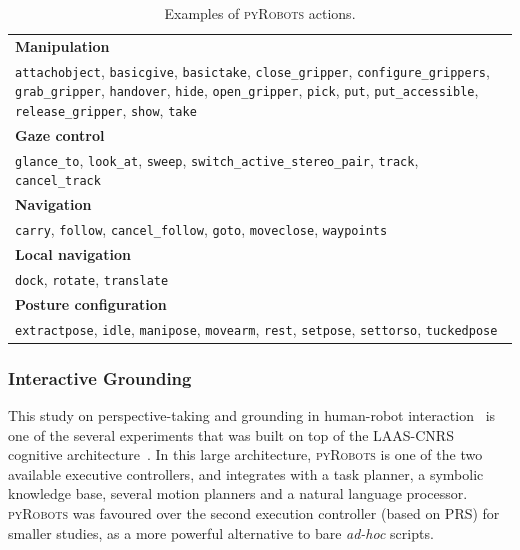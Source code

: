 \documentclass[letterpaper, 10pt, conference]{ieeeconf}      %
\newcommand{\pyRobots}{\textsc{pyRobots}}
\begin{document}
\begin{table}[ht!]
\begin{center}
\begin{tabular}{p{}}
    \toprule
    {\bf Manipulation} \\
     {\tt attachobject}, {\tt basicgive}, {\tt basictake}, {\tt close\_gripper}, {\tt configure\_grippers}, {\tt grab\_gripper}, {\tt handover}, {\tt hide}, {\tt open\_gripper}, {\tt pick}, {\tt put}, {\tt put\_accessible}, {\tt release\_gripper}, {\tt show}, {\tt take} \\
     \midrule
    {\bf Gaze control} \\
     {\tt glance\_to}, {\tt look\_at}, {\tt sweep}, {\tt switch\_active\_stereo\_pair}, {\tt track}, {\tt cancel\_track} \\
     \midrule
    {\bf Navigation} \\
     {\tt carry}, {\tt follow}, {\tt cancel\_follow}, {\tt goto}, {\tt moveclose}, {\tt waypoints} \\
     \midrule
    {\bf Local navigation} \\
     {\tt dock}, {\tt rotate}, {\tt translate} \\
     \midrule
    {\bf Posture configuration} \\
     {\tt extractpose}, {\tt idle}, {\tt manipose}, {\tt movearm}, {\tt rest}, {\tt setpose}, {\tt settorso}, {\tt tuckedpose} \\
     \bottomrule
\end{tabular}
\end{center}
\caption{Examples of \pyRobots{} actions.}

\label{pyrobots_actions}
\end{table}

\subsubsection{Interactive Grounding} This study on perspective-taking and grounding
in human-robot interaction~\cite{lemaignan2013talking} is one of the several
experiments that was built on top of the LAAS-CNRS cognitive
architecture~\cite{lemaignan2014human}. In this large architecture, \pyRobots{}
is one of the two available executive controllers, and integrates with a task
planner, a symbolic knowledge base, several motion planners and a natural
language processor. \pyRobots{} was favoured over the second execution
controller (based on PRS) for smaller studies, as a more powerful alternative to
bare \textit{ad-hoc} scripts.
\end{document}
